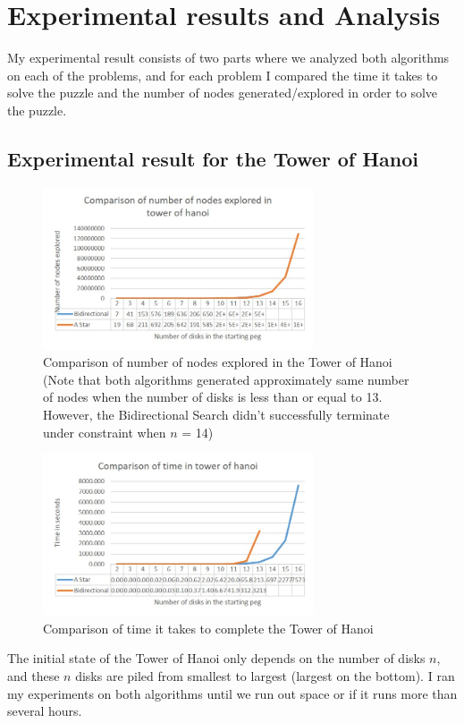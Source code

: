 \documentclass[conference]{IEEEtran}
\begin{document}
\section{Experimental results and Analysis}

My experimental result consists of two parts where we analyzed both algorithms on each of the problems, and for each problem I compared the time it takes to solve the puzzle and the number of nodes generated/explored in order to solve the puzzle.

\subsection{Experimental result for the Tower of Hanoi}

\begin{figure}[!t]
\includegraphics[width=8cm]{hanoiNodes}
\centering
\caption{Comparison of number of nodes explored in the Tower of Hanoi (Note that both algorithms generated approximately same number of nodes when the number of disks is less than or equal to 13. However, the Bidirectional Search didn't successfully terminate under constraint when $n$ = 14)}
\label{fig_sim}
\end{figure}

\begin{figure}[!t]
\includegraphics[width=8cm]{hanoiTime}
\centering
\caption{Comparison of time it takes to complete the Tower of Hanoi}
\label{fig_sim}
\end{figure}

The initial state of the Tower of Hanoi only depends on the number of disks $n$, and these $n$ disks are piled from smallest to largest (largest on the bottom). I ran my experiments on both algorithms until we run out space or if it runs more than several hours.
\end{document}

